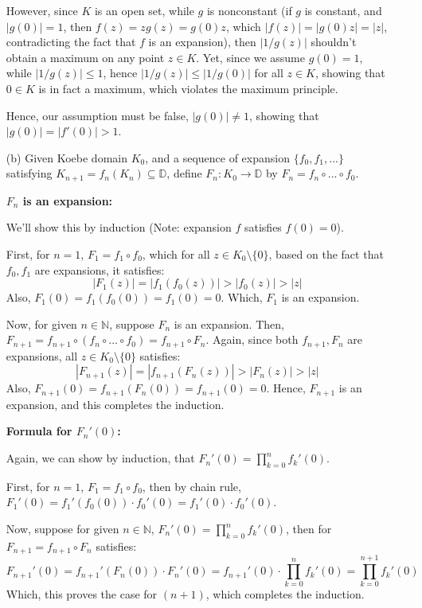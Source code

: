 \documentclass{article}
\begin{document}
\begin{itemize}
    However, since $K$ is an open set, while $g$ is nonconstant (if $g$ is constant, and $|g(0)|=1$, then $f(z)=zg(z)=g(0)z$, which $|f(z)|=|g(0)z|=|z|$, contradicting the fact that $f$ is an expansion), then $|1/g(z)|$ shouldn't obtain a maximum on any point $z\in K$.
    Yet, since we assume $g(0)=1$, while $|1/g(z)|\leq 1$, hence $|1/g(z)|\leq |1/g(0)|$ for all $z\in K$, showing that $0\in K$ is in fact a maximum, which violates the maximum principle.

    Hence, our assumption must be false, $|g(0)|\neq 1$, showing that $|g(0)|=|f'(0)|>1$.

    \hfil

    \item[(b)] Given Koebe domain $K_0$, and a sequence of expansion $\{f_0,f_1,...\}$ satisfying $K_{n+1}=f_n(K_n)\subseteq \mathbb{D}$, define $F_n:K_0\rightarrow\mathbb{D}$ by $F_n=f_n\circ...\circ f_0$.

    \textbf{$F_n$ is an expansion:}

    We'll show this by induction (Note: expansion $f$ satisfies $f(0)=0$). 

    First, for $n=1$, $F_1=f_1\circ f_0$, which for all $z\in K_0\setminus\{0\}$, based on the fact that $f_0,f_1$ are expansions, it satisfies:
    $$|F_1(z)| = |f_1(f_0(z))|>|f_0(z)|>|z|$$
    Also, $F_1(0)=f_1(f_0(0))=f_1(0)=0$. Which, $F_1$ is an expansion.

    Now, for given $n\in\mathbb{N}$, suppose $F_n$ is an expansion. Then, $F_{n+1}=f_{n+1}\circ (f_n\circ...\circ f_0)=f_{n+1}\circ F_n$. Again, since both $f_{n+1}, F_n$ are expansions, all $z\in K_0\setminus\{0\}$ satisfies:
    $$|F_{n+1}(z)|=|f_{n+1}(F_n(z))|>|F_n(z)|>|z|$$
    Also, $F_{n+1}(0)=f_{n+1}(F_n(0))=f_{n+1}(0)=0$. Hence, $F_{n+1}$ is an expansion, and this completes the induction.

    \textbf{Formula for $F_n'(0)$:}

    Again, we can show by induction, that $F_n'(0)=\prod_{k=0}^{n}f_k'(0)$.

    First, for $n=1$, $F_1=f_1\circ f_0$, then by chain rule, $F_1'(0)=f_1'(f_0(0))\cdot f_0'(0) = f_1'(0)\cdot f_0'(0)$.

    Now, suppose for given $n\in\mathbb{N}$, $F_n'(0)=\prod_{k=0}^{n}f_k'(0)$, then for $F_{n+1}=f_{n+1}\circ F_n$ satisfies:
    $$F_{n+1}'(0)=f_{n+1}'(F_n(0))\cdot F_n'(0) = f_{n+1}'(0)\cdot \prod_{k=0}^{n}f_k'(0) = \prod_{k=0}^{n+1}f_k'(0)$$
    Which, this proves the case for $(n+1)$, which completes the induction.


\end{itemize}
\end{document}

